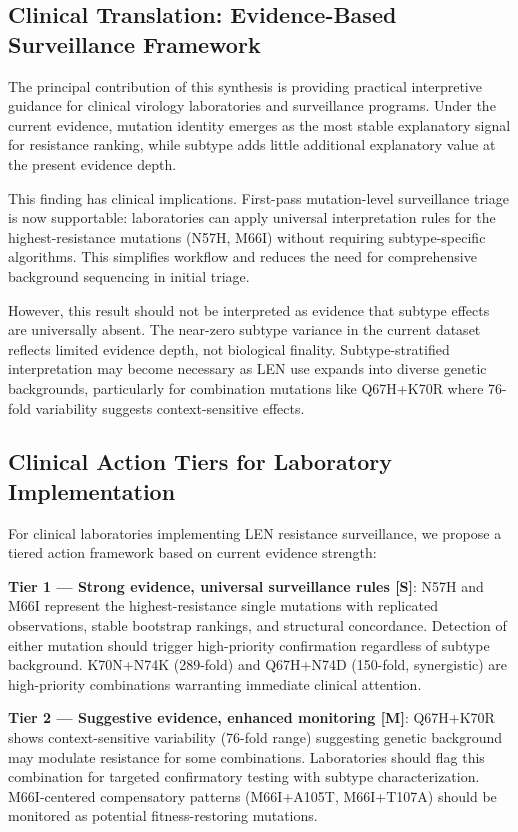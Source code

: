 \documentclass[12pt,a4paper]{article}
\newcommand{\claimlabel}[1]{\textbf{[#1]}}
\begin{document}
\subsection{Clinical Translation: Evidence-Based Surveillance Framework}

The principal contribution of this synthesis is providing practical interpretive guidance for clinical virology laboratories and surveillance programs. Under the current evidence, mutation identity emerges as the most stable explanatory signal for resistance ranking, while subtype adds little additional explanatory value at the present evidence depth.

This finding has clinical implications. First-pass mutation-level surveillance triage is now supportable: laboratories can apply universal interpretation rules for the highest-resistance mutations (N57H, M66I) without requiring subtype-specific algorithms. This simplifies workflow and reduces the need for comprehensive background sequencing in initial triage.

However, this result should not be interpreted as evidence that subtype effects are universally absent. The near-zero subtype variance in the current dataset reflects limited evidence depth, not biological finality. Subtype-stratified interpretation may become necessary as LEN use expands into diverse genetic backgrounds, particularly for combination mutations like Q67H+K70R where 76-fold variability suggests context-sensitive effects.

\subsection{Clinical Action Tiers for Laboratory Implementation}

For clinical laboratories implementing LEN resistance surveillance, we propose a tiered action framework based on current evidence strength:

\textbf{Tier 1 --- Strong evidence, universal surveillance rules \claimlabel{S}}: N57H and M66I represent the highest-resistance single mutations with replicated observations, stable bootstrap rankings, and structural concordance. Detection of either mutation should trigger high-priority confirmation regardless of subtype background. K70N+N74K (289-fold) and Q67H+N74D (150-fold, synergistic) are high-priority combinations warranting immediate clinical attention.

\textbf{Tier 2 --- Suggestive evidence, enhanced monitoring \claimlabel{M}}: Q67H+K70R shows context-sensitive variability (76-fold range) suggesting genetic background may modulate resistance for some combinations. Laboratories should flag this combination for targeted confirmatory testing with subtype characterization. M66I-centered compensatory patterns (M66I+A105T, M66I+T107A) should be monitored as potential fitness-restoring mutations.
\end{document}
